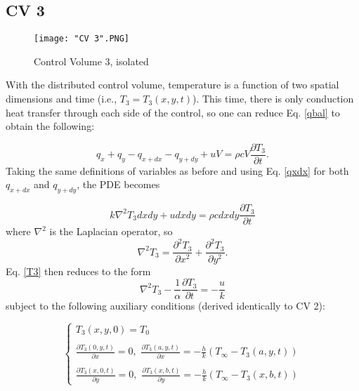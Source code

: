 \documentclass{article}
\newcommand{\dTTdt}{\frac{\partial T_3}{\partial t}}
\newcommand{\dTTdx}{\frac{\partial^2 T_3}{\partial x^2}}
\newcommand{\dTTdy}{\frac{\partial^2 T_3}{\partial y^2}}
\begin{document}
\subsection*{CV 3}
\begin{figure}[ht!]
    \centering
    \texttt{[image: "CV 3".PNG]}
    \caption{Control Volume 3, isolated}
    \label{fig:CV 3}
\end{figure}

With the distributed control volume, temperature is a function of two spatial dimensions and time (i.e., $T_3 = T_3(x,y,t)$). This time, there is only conduction heat transfer through each side of the control, so one can reduce Eq. \eqref{qbal} to obtain the following:

\begin{equation}
    q_x + q_y - q_{x+dx} - q_{y+dy} + uV = \rho c V \dTTdt.
\end{equation}
Taking the same definitions of variables as before and using Eq. \eqref{qxdx} for both $q_{x+dx}$ and $q_{y+dy}$, the PDE becomes

\begin{equation}
    k \nabla^2 T_3 dx dy + u dx dy = \rho c dx dy \dTTdt
    \label{T3}
\end{equation}
where $\nabla^2$ is the Laplacian operator, so 
\begin{equation}
    \nabla^2 T_3 = \dTTdx + \dTTdy.
\end{equation}
Eq. \eqref{T3} then reduces to the form
\begin{equation}
    \nabla^2 T_3 - \frac{1}{\alpha} \dTTdt = -\frac{u}{k}
\end{equation}
subject to the following auxiliary conditions (derived identically to CV 2):

\begin{equation}
    \begin{cases}
    T_3(x,y,0) = T_0 \\
    \\
    \frac{\partial T_3(0,y,t)}{\partial x} = 0, \, \, \frac{\partial T_3(a,y,t)}{\partial x} = -\frac{h}{k}(T_\infty - T_3(a,y,t)) \\
    \\
    \frac{\partial T_3(x,0,t)}{\partial y} = 0, \, \, \frac{\partial T_3(x,b,t)}{\partial y} = -\frac{h}{k}(T_\infty - T_3(x,b,t))
    \end{cases}
    \label{BC3}
\end{equation}


\end{document}
